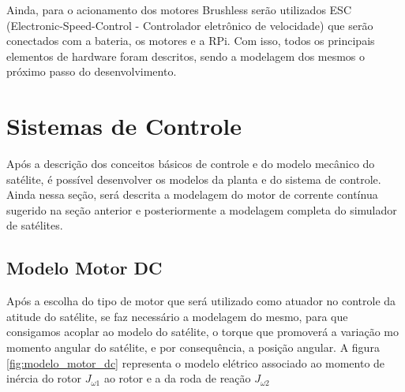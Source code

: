 Ainda, para o acionamento dos motores Brushless serão utilizados ESC (Electronic-Speed-Control - Controlador eletrônico de velocidade) que serão conectados com a bateria, os motores e a RPi. Com isso, todos os principais elementos de hardware foram descritos, sendo a modelagem dos mesmos o próximo passo do desenvolvimento.



\section{Sistemas de Controle}

Após a descrição dos conceitos básicos de controle e do modelo mecânico do satélite, é possível desenvolver os modelos da planta e do sistema de controle. Ainda nessa seção, será descrita a modelagem do motor de corrente contínua sugerido na seção anterior e posteriormente a modelagem completa do simulador de satélites.


\subsection{Modelo Motor DC}

Após a escolha do tipo de motor que será utilizado como atuador no controle da atitude do satélite, se faz necessário a modelagem do mesmo, para que consigamos acoplar ao modelo do satélite, o torque que promoverá a variação mo momento angular do satélite, e por consequência, a posição angular. A figura \ref{fig:modelo_motor_dc} representa o modelo elétrico associado ao momento de inércia do rotor $J_{\omega 1}$ ao rotor e a da roda de reação $J_{\omega 2}$


